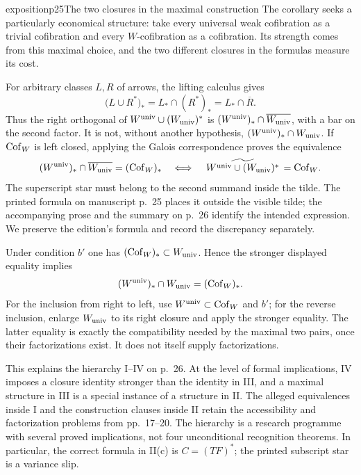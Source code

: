 \begin{dcomment}{exposition}{p25}{The two closures in the maximal construction}
The corollary seeks a particularly economical structure: take every universal weak cofibration as a trivial cofibration and every $W$-cofibration as a cofibration. Its strength comes from this maximal choice, and the two different closures in the formulas measure its cost.

For arbitrary classes $L,R$ of arrows, the lifting calculus gives
\[
 \bigl(L\cup R^*\bigr)_*=L_*\cap(R^*)_*
       =L_*\cap\overline R.
\]
Thus the right orthogonal of $W^{\mathrm{univ}}\cup(W_{\mathrm{univ}})^*$ is
$(W^{\mathrm{univ}})_*\cap\overline{W_{\mathrm{univ}}}$, with a bar on the second factor. It is not, without another hypothesis, $(W^{\mathrm{univ}})_*\cap W_{\mathrm{univ}}$. If $\mathrm{Cof}_W$ is left closed, applying the Galois correspondence proves the equivalence
\[
 (W^{\mathrm{univ}})_*\cap\overline{W_{\mathrm{univ}}}=(\mathrm{Cof}_W)_*
 \quad\Longleftrightarrow\quad
 \widetilde{\,W^{\mathrm{univ}}\cup(W_{\mathrm{univ}})^*\,}=\mathrm{Cof}_W.
\]
The superscript star must belong to the second summand inside the tilde. The printed formula on manuscript p.~25 places it outside the visible tilde; the accompanying prose and the summary on p.~26 identify the intended expression. We preserve the edition's formula and record the discrepancy separately.

Under condition $b'$ one has $(\mathrm{Cof}_W)_*\subset W_{\mathrm{univ}}$. Hence the stronger displayed equality implies
\[
 (W^{\mathrm{univ}})_*\cap W_{\mathrm{univ}}=(\mathrm{Cof}_W)_*.
\]
For the inclusion from right to left, use $W^{\mathrm{univ}}\subset\mathrm{Cof}_W$ and $b'$; for the reverse inclusion, enlarge $W_{\mathrm{univ}}$ to its right closure and apply the stronger equality. The latter equality is exactly the compatibility needed by the maximal two pairs, once their factorizations exist. It does not itself supply factorizations.

This explains the hierarchy I--IV on p.~26. At the level of formal implications, IV imposes a closure identity stronger than the identity in III, and a maximal structure in III is a special instance of a structure in II. The alleged equivalences inside I and the construction clauses inside II retain the accessibility and factorization problems from pp.~17--20. The hierarchy is a research programme with several proved implications, not four unconditional recognition theorems. In particular, the correct formula in II(c) is $C=(TF)^*$; the printed subscript star is a variance slip.
\end{dcomment}


